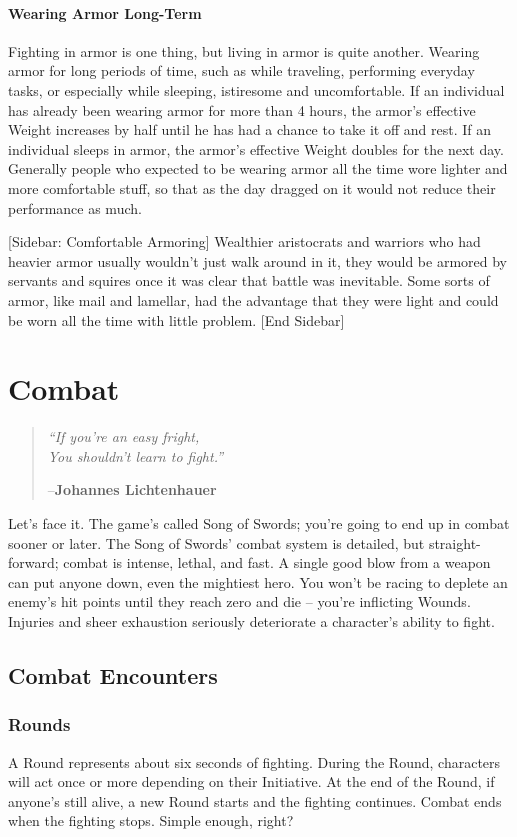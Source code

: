 \documentclass[oneside,11pt,english]{book}
\begin{document}
\subsubsection{Wearing Armor Long-Term}
Fighting in armor is one thing, but living in armor is quite another. Wearing
armor for long periods of time, such as while traveling, performing everyday
tasks, or especially while sleeping, istiresome and uncomfortable. If an
individual has already been wearing armor for more than 4 hours, the armor’s
effective Weight increases by half until he has had a chance to take it off and
rest. If an individual sleeps in armor, the armor’s effective Weight doubles for
the next day. Generally people who expected to be wearing armor all the time
wore lighter and more comfortable stuff, so that as the day dragged on it would
not reduce their performance as much.


[Sidebar: Comfortable Armoring] Wealthier aristocrats and warriors who had
heavier armor usually wouldn’t just walk around in it, they would be armored by
servants and squires once it was clear that battle was inevitable. Some sorts of
armor, like mail and lamellar, had the advantage that they were light and could
be worn all the time with little problem. [End Sidebar]


\chapter{Combat}\label{ch:combat}
\startcontents[chapters]
\clearpage
\begin{quote}
  \centering
  \emph{“If you’re an easy fright,\\
    You shouldn’t learn to fight.”}\par
  \hfill--\textbf{Johannes Lichtenhauer}
\end{quote}
Let’s face it. The game’s called Song of Swords; you’re going to end up in
combat sooner or later. The Song of Swords’ combat system is detailed, but
straight-forward; combat is intense, lethal, and fast. A single good blow from a
weapon can put anyone down, even the mightiest hero. You won’t be racing to
deplete an enemy’s hit points until they reach zero and die -- you’re inflicting
Wounds. Injuries and sheer exhaustion seriously deteriorate a character’s
ability to fight.
\section{Combat Encounters}
\subsection{Rounds}
A Round represents about six seconds of fighting. During the Round, characters
will act once or more depending on their Initiative. At the end of the Round, if
anyone’s still alive, a new Round starts and the fighting continues. Combat ends
when the fighting stops. Simple enough, right?
\end{document}
